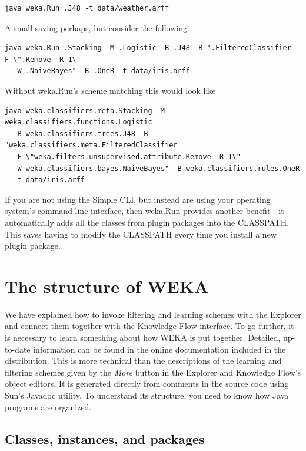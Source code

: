 \begin{Verbatim}[fontsize=\footnotesize]
java weka.Run .J48 -t data/weather.arff
\end{Verbatim}

\noindent A small saving perhaps, but consider the following

\begin{Verbatim}[fontsize=\footnotesize]
java weka.Run .Stacking -M .Logistic -B .J48 -B ".FilteredClassifier -F \".Remove -R 1\" 
  -W .NaiveBayes" -B .OneR -t data/iris.arff
\end{Verbatim}

\noindent Without weka.Run's scheme matching this would look like

\begin{Verbatim}[fontsize=\footnotesize]
java weka.classifiers.meta.Stacking -M weka.classifiers.functions.Logistic 
  -B weka.classifiers.trees.J48 -B "weka.classifiers.meta.FilteredClassifier 
  -F \"weka.filters.unsupervised.attribute.Remove -R 1\" 
  -W weka.classifiers.bayes.NaiveBayes" -B weka.classifiers.rules.OneR 
  -t data/iris.arff
\end{Verbatim}

\noindent If you are not using the Simple CLI, but instead are using
your operating system's command-line interface, then weka.Run provides
another benefit---it automatically adds all the classes from plugin
packages into the CLASSPATH. This saves having to modify the CLASSPATH
every time you install a new plugin package.

\section{The structure of WEKA}

We have explained how to invoke filtering and learning schemes with
the Explorer and connect them together with the Knowledge Flow
interface. To go further, it is necessary to learn something about how
WEKA is put together. Detailed, up-to-date information can be found in
the online documentation included in the distribution. This is more
technical than the descriptions of the learning and filtering schemes
given by the \textit{More} button in the Explorer and Knowledge Flow's
object editors. It is generated directly from comments in the source
code using Sun's Javadoc utility. To understand its structure, you
need to know how Java programs are organized.

\subsection{Classes, instances, and packages}

